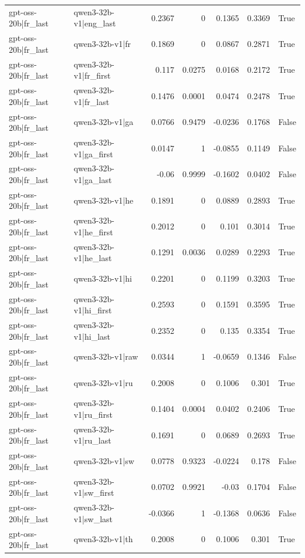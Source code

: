 \begin{table}
\begin{tabular}{l l r r r r l}
gpt-oss-20b|fr_last & qwen3-32b-v1|eng_last & 0.2367 & 0 & 0.1365 & 0.3369 & True \\
gpt-oss-20b|fr_last & qwen3-32b-v1|fr & 0.1869 & 0 & 0.0867 & 0.2871 & True \\
gpt-oss-20b|fr_last & qwen3-32b-v1|fr_first & 0.117 & 0.0275 & 0.0168 & 0.2172 & True \\
gpt-oss-20b|fr_last & qwen3-32b-v1|fr_last & 0.1476 & 0.0001 & 0.0474 & 0.2478 & True \\
gpt-oss-20b|fr_last & qwen3-32b-v1|ga & 0.0766 & 0.9479 & -0.0236 & 0.1768 & False \\
gpt-oss-20b|fr_last & qwen3-32b-v1|ga_first & 0.0147 & 1 & -0.0855 & 0.1149 & False \\
gpt-oss-20b|fr_last & qwen3-32b-v1|ga_last & -0.06 & 0.9999 & -0.1602 & 0.0402 & False \\
gpt-oss-20b|fr_last & qwen3-32b-v1|he & 0.1891 & 0 & 0.0889 & 0.2893 & True \\
gpt-oss-20b|fr_last & qwen3-32b-v1|he_first & 0.2012 & 0 & 0.101 & 0.3014 & True \\
gpt-oss-20b|fr_last & qwen3-32b-v1|he_last & 0.1291 & 0.0036 & 0.0289 & 0.2293 & True \\
gpt-oss-20b|fr_last & qwen3-32b-v1|hi & 0.2201 & 0 & 0.1199 & 0.3203 & True \\
gpt-oss-20b|fr_last & qwen3-32b-v1|hi_first & 0.2593 & 0 & 0.1591 & 0.3595 & True \\
gpt-oss-20b|fr_last & qwen3-32b-v1|hi_last & 0.2352 & 0 & 0.135 & 0.3354 & True \\
gpt-oss-20b|fr_last & qwen3-32b-v1|raw & 0.0344 & 1 & -0.0659 & 0.1346 & False \\
gpt-oss-20b|fr_last & qwen3-32b-v1|ru & 0.2008 & 0 & 0.1006 & 0.301 & True \\
gpt-oss-20b|fr_last & qwen3-32b-v1|ru_first & 0.1404 & 0.0004 & 0.0402 & 0.2406 & True \\
gpt-oss-20b|fr_last & qwen3-32b-v1|ru_last & 0.1691 & 0 & 0.0689 & 0.2693 & True \\
gpt-oss-20b|fr_last & qwen3-32b-v1|sw & 0.0778 & 0.9323 & -0.0224 & 0.178 & False \\
gpt-oss-20b|fr_last & qwen3-32b-v1|sw_first & 0.0702 & 0.9921 & -0.03 & 0.1704 & False \\
gpt-oss-20b|fr_last & qwen3-32b-v1|sw_last & -0.0366 & 1 & -0.1368 & 0.0636 & False \\
gpt-oss-20b|fr_last & qwen3-32b-v1|th & 0.2008 & 0 & 0.1006 & 0.301 & True \\

\end{tabular}
\end{table}
